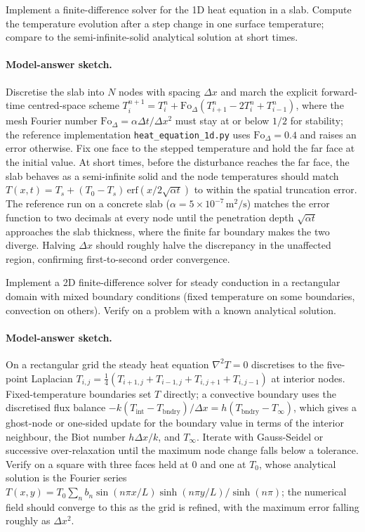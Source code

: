 \begin{exercise}
Implement a finite-difference solver for the 1D heat equation in a
slab. Compute the temperature evolution after a step change in one
surface temperature; compare to the semi-infinite-solid analytical
solution at short times.
\paragraph{Model-answer sketch.} Discretise the slab into $N$ nodes with
spacing $\Delta x$ and march the explicit forward-time centred-space
scheme $T_i^{n+1} = T_i^n + \text{Fo}_{\Delta}(T_{i+1}^n - 2T_i^n +
T_{i-1}^n)$, where the mesh Fourier number $\text{Fo}_{\Delta} = \alpha
\Delta t/\Delta x^2$ must stay at or below $1/2$ for stability; the
reference implementation \texttt{heat\_equation\_1d.py} uses
$\text{Fo}_{\Delta} = 0.4$ and raises an error otherwise. Fix one face
to the stepped temperature and hold the far face at the initial value.
At short times, before the disturbance reaches the far face, the slab
behaves as a semi-infinite solid and the node temperatures should match
$T(x,t) = T_s + (T_0 - T_s)\,\text{erf}(x/2\sqrt{\alpha t})$ to within
the spatial truncation error. The reference run on a concrete slab
($\alpha = 5\times10^{-7}\,\text{m}^2/\text{s}$) matches the error
function to two decimals at every node until the penetration depth
$\sqrt{\alpha t}$ approaches the slab thickness, where the finite far
boundary makes the two diverge. Halving $\Delta x$ should roughly halve
the discrepancy in the unaffected region, confirming first-to-second
order convergence.
\end{exercise}

\begin{exercise}
Implement a 2D finite-difference solver for steady conduction in a
rectangular domain with mixed boundary conditions (fixed temperature
on some boundaries, convection on others). Verify on a problem with
a known analytical solution.
\paragraph{Model-answer sketch.} On a rectangular grid the steady heat
equation $\nabla^2 T = 0$ discretises to the five-point Laplacian
$T_{i,j} = \tfrac14(T_{i+1,j} + T_{i-1,j} + T_{i,j+1} + T_{i,j-1})$ at
interior nodes. Fixed-temperature boundaries set $T$ directly; a
convective boundary uses the discretised flux balance $-k(T_{\text{int}}
- T_{\text{bndry}})/\Delta x = h(T_{\text{bndry}} - T_\infty)$, which
gives a ghost-node or one-sided update for the boundary value in terms of
the interior neighbour, the Biot number $h\Delta x/k$, and $T_\infty$.
Iterate with Gauss-Seidel or successive over-relaxation until the maximum
node change falls below a tolerance. Verify on a square with three faces
held at $0$ and one at $T_0$, whose analytical solution is the Fourier
series $T(x,y) = T_0\sum_n b_n \sin(n\pi x/L)\sinh(n\pi y/L)/\sinh(n\pi)$;
the numerical field should converge to this as the grid is refined, with
the maximum error falling roughly as $\Delta x^2$.
\end{exercise}

